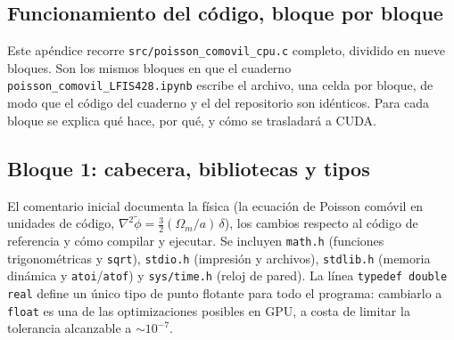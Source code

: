 \begin{appendix}
\onecolumn
\nolinenumbers
\section{Funcionamiento del código, bloque por bloque}
\label{ap:codigo}

Este apéndice recorre \texttt{src/poisson\_comovil\_cpu.c} completo, dividido en nueve bloques. Son los mismos bloques en que el cuaderno \texttt{poisson\_comovil\_LFIS428.ipynb} escribe el archivo, una celda por bloque, de modo que el código del cuaderno y el del repositorio son idénticos. Para cada bloque se explica qué hace, por qué, y cómo se trasladará a CUDA.

\subsection{Bloque 1: cabecera, bibliotecas y tipos}

El comentario inicial documenta la física (la ecuación de Poisson comóvil en unidades de código, $\nabla^2\tilde\phi=\tfrac32(\Omega_m/a)\,\delta$), los cambios respecto al código de referencia y cómo compilar y ejecutar. Se incluyen \texttt{math.h} (funciones trigonométricas y \texttt{sqrt}), \texttt{stdio.h} (impresión y archivos), \texttt{stdlib.h} (memoria dinámica y \texttt{atoi}/\texttt{atof}) y \texttt{sys/time.h} (reloj de pared). La línea \texttt{typedef double real} define un único tipo de punto flotante para todo el programa: cambiarlo a \texttt{float} es una de las optimizaciones posibles en GPU, a costa de limitar la tolerancia alcanzable a $\sim10^{-7}$.


\end{appendix}

